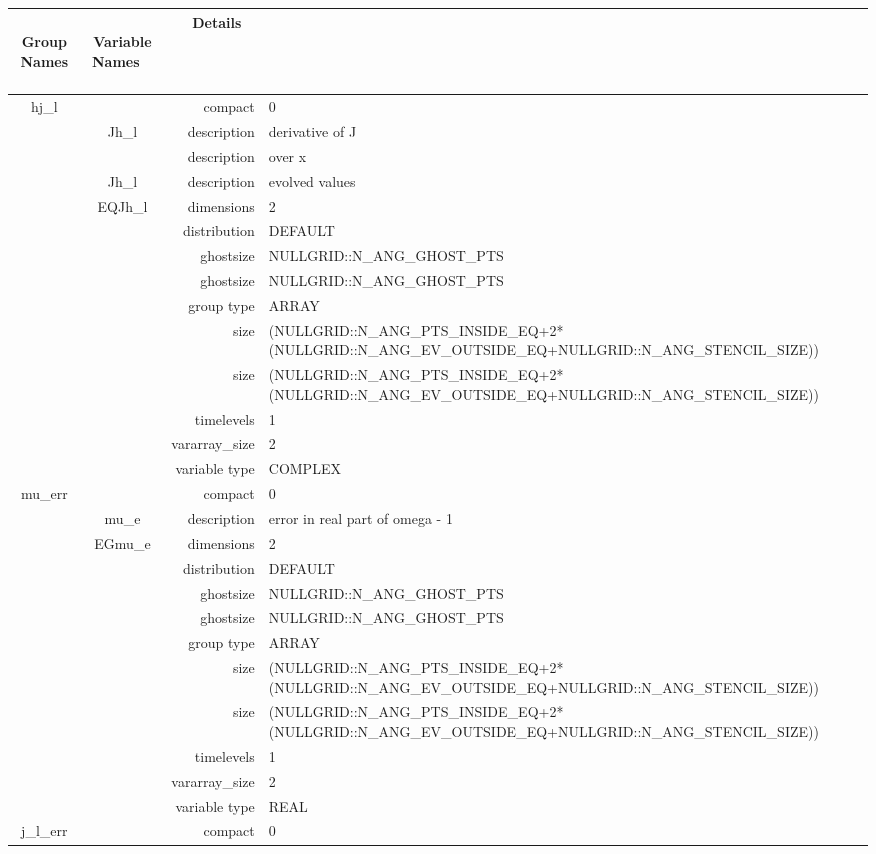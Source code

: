 \begin{tabular*}{150mm}{|c|c@{\extracolsep{\fill}}|rl|} \hline 
~ {\bf Group Names} ~ & ~ {\bf Variable Names} ~  &{\bf Details} ~ & ~ \\ 
\hline 
hj\_l &  & compact & 0 \\ 
 & Jh\_l & description & derivative of J \\ 
& ~ & description &  over x \\ 
 & Jh\_l & description &  evolved values \\ 
 & EQJh\_l & dimensions & 2 \\ 
 &  & distribution & DEFAULT \\ 
 &  & ghostsize & NULLGRID::N\_ANG\_GHOST\_PTS \\ 
& ~ & ghostsize & NULLGRID::N\_ANG\_GHOST\_PTS \\ 
 &  & group type & ARRAY \\ 
 &  & size & (NULLGRID::N\_ANG\_PTS\_INSIDE\_EQ+2*(NULLGRID::N\_ANG\_EV\_OUTSIDE\_EQ+NULLGRID::N\_ANG\_STENCIL\_SIZE)) \\ 
& ~ & size & (NULLGRID::N\_ANG\_PTS\_INSIDE\_EQ+2*(NULLGRID::N\_ANG\_EV\_OUTSIDE\_EQ+NULLGRID::N\_ANG\_STENCIL\_SIZE)) \\ 
 &  & timelevels & 1 \\ 
 &  & vararray\_size & 2 \\ 
 &  & variable type & COMPLEX \\ 
\hline 
mu\_err &  & compact & 0 \\ 
 & mu\_e & description & error in real part of omega - 1 \\ 
 & EGmu\_e & dimensions & 2 \\ 
 &  & distribution & DEFAULT \\ 
 &  & ghostsize & NULLGRID::N\_ANG\_GHOST\_PTS \\ 
& ~ & ghostsize & NULLGRID::N\_ANG\_GHOST\_PTS \\ 
 &  & group type & ARRAY \\ 
 &  & size & (NULLGRID::N\_ANG\_PTS\_INSIDE\_EQ+2*(NULLGRID::N\_ANG\_EV\_OUTSIDE\_EQ+NULLGRID::N\_ANG\_STENCIL\_SIZE)) \\ 
& ~ & size & (NULLGRID::N\_ANG\_PTS\_INSIDE\_EQ+2*(NULLGRID::N\_ANG\_EV\_OUTSIDE\_EQ+NULLGRID::N\_ANG\_STENCIL\_SIZE)) \\ 
 &  & timelevels & 1 \\ 
 &  & vararray\_size & 2 \\ 
 &  & variable type & REAL \\ 
\hline 
j\_l\_err &  & compact & 0 \\ 

\end{tabular*}

